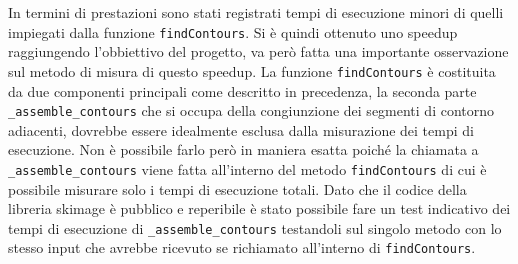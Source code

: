 \documentclass[12pt,a4paper]{report}
\begin{document}
{\begin{figure}[H]
\centering
\begin{floatrow}[1]
\end{floatrow}
\end{figure} 
\begin{figure}[H]
\centering
\begin{floatrow}[1]
\end{floatrow}
\end{figure} 
\newpage
In termini di prestazioni sono stati registrati tempi di esecuzione minori di quelli impiegati dalla funzione \verb|findContours|. Si è quindi ottenuto uno speedup raggiungendo l'obbiettivo del progetto, va però fatta una importante osservazione sul metodo di misura di questo speedup. \newline
La funzione \verb|findContours| è costituita da due componenti principali come descritto in precedenza, la seconda parte \verb|_assemble_contours| che si occupa della congiunzione dei segmenti di contorno adiacenti, dovrebbe essere idealmente esclusa dalla misurazione dei tempi di esecuzione. Non è possibile farlo però in maniera esatta poiché la chiamata a \verb|_assemble_contours| viene fatta all'interno del metodo \verb|findContours| di cui è possibile misurare solo i tempi di esecuzione totali. Dato che il codice della libreria skimage è pubblico e reperibile è stato possibile fare un test indicativo dei tempi di esecuzione di \verb|_assemble_contours| testandoli sul singolo metodo con lo stesso input che avrebbe ricevuto se richiamato all'interno di \verb|findContours|. 
}
\end{document}
